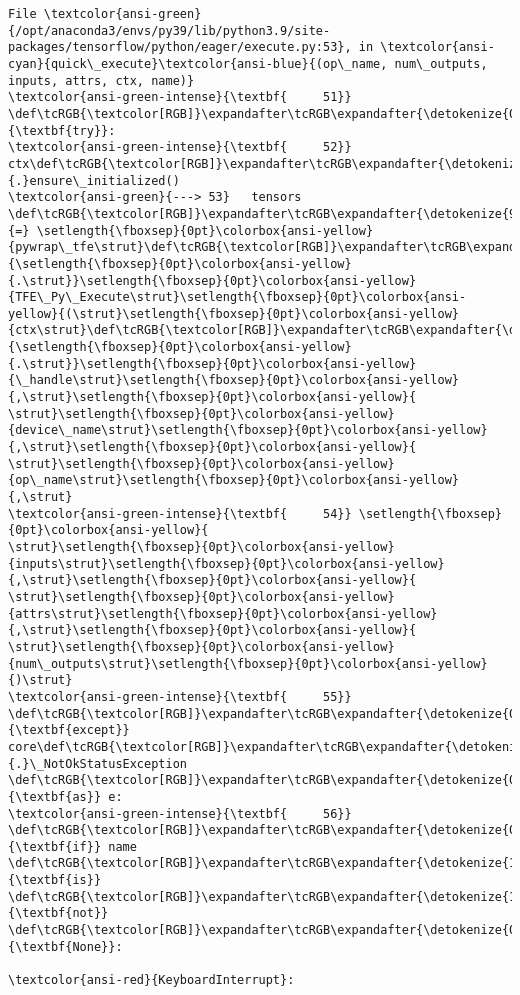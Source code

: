 \documentclass[11pt]{article}
\begin{document}
\begin{Verbatim}[commandchars=\\\{\}, frame=single, framerule=2mm, rulecolor=\color{outerrorbackground}]
File \textcolor{ansi-green}{/opt/anaconda3/envs/py39/lib/python3.9/site-packages/tensorflow/python/eager/execute.py:53}, in \textcolor{ansi-cyan}{quick\_execute}\textcolor{ansi-blue}{(op\_name, num\_outputs, inputs, attrs, ctx, name)}
\textcolor{ansi-green-intense}{\textbf{     51}} \def\tcRGB{\textcolor[RGB]}\expandafter\tcRGB\expandafter{\detokenize{0,135,0}}{\textbf{try}}:
\textcolor{ansi-green-intense}{\textbf{     52}}   ctx\def\tcRGB{\textcolor[RGB]}\expandafter\tcRGB\expandafter{\detokenize{98,98,98}}{.}ensure\_initialized()
\textcolor{ansi-green}{---> 53}   tensors \def\tcRGB{\textcolor[RGB]}\expandafter\tcRGB\expandafter{\detokenize{98,98,98}}{=} \setlength{\fboxsep}{0pt}\colorbox{ansi-yellow}{pywrap\_tfe\strut}\def\tcRGB{\textcolor[RGB]}\expandafter\tcRGB\expandafter{\detokenize{98,98,98}}{\setlength{\fboxsep}{0pt}\colorbox{ansi-yellow}{.\strut}}\setlength{\fboxsep}{0pt}\colorbox{ansi-yellow}{TFE\_Py\_Execute\strut}\setlength{\fboxsep}{0pt}\colorbox{ansi-yellow}{(\strut}\setlength{\fboxsep}{0pt}\colorbox{ansi-yellow}{ctx\strut}\def\tcRGB{\textcolor[RGB]}\expandafter\tcRGB\expandafter{\detokenize{98,98,98}}{\setlength{\fboxsep}{0pt}\colorbox{ansi-yellow}{.\strut}}\setlength{\fboxsep}{0pt}\colorbox{ansi-yellow}{\_handle\strut}\setlength{\fboxsep}{0pt}\colorbox{ansi-yellow}{,\strut}\setlength{\fboxsep}{0pt}\colorbox{ansi-yellow}{ \strut}\setlength{\fboxsep}{0pt}\colorbox{ansi-yellow}{device\_name\strut}\setlength{\fboxsep}{0pt}\colorbox{ansi-yellow}{,\strut}\setlength{\fboxsep}{0pt}\colorbox{ansi-yellow}{ \strut}\setlength{\fboxsep}{0pt}\colorbox{ansi-yellow}{op\_name\strut}\setlength{\fboxsep}{0pt}\colorbox{ansi-yellow}{,\strut}
\textcolor{ansi-green-intense}{\textbf{     54}} \setlength{\fboxsep}{0pt}\colorbox{ansi-yellow}{                                      \strut}\setlength{\fboxsep}{0pt}\colorbox{ansi-yellow}{inputs\strut}\setlength{\fboxsep}{0pt}\colorbox{ansi-yellow}{,\strut}\setlength{\fboxsep}{0pt}\colorbox{ansi-yellow}{ \strut}\setlength{\fboxsep}{0pt}\colorbox{ansi-yellow}{attrs\strut}\setlength{\fboxsep}{0pt}\colorbox{ansi-yellow}{,\strut}\setlength{\fboxsep}{0pt}\colorbox{ansi-yellow}{ \strut}\setlength{\fboxsep}{0pt}\colorbox{ansi-yellow}{num\_outputs\strut}\setlength{\fboxsep}{0pt}\colorbox{ansi-yellow}{)\strut}
\textcolor{ansi-green-intense}{\textbf{     55}} \def\tcRGB{\textcolor[RGB]}\expandafter\tcRGB\expandafter{\detokenize{0,135,0}}{\textbf{except}} core\def\tcRGB{\textcolor[RGB]}\expandafter\tcRGB\expandafter{\detokenize{98,98,98}}{.}\_NotOkStatusException \def\tcRGB{\textcolor[RGB]}\expandafter\tcRGB\expandafter{\detokenize{0,135,0}}{\textbf{as}} e:
\textcolor{ansi-green-intense}{\textbf{     56}}   \def\tcRGB{\textcolor[RGB]}\expandafter\tcRGB\expandafter{\detokenize{0,135,0}}{\textbf{if}} name \def\tcRGB{\textcolor[RGB]}\expandafter\tcRGB\expandafter{\detokenize{175,0,255}}{\textbf{is}} \def\tcRGB{\textcolor[RGB]}\expandafter\tcRGB\expandafter{\detokenize{175,0,255}}{\textbf{not}} \def\tcRGB{\textcolor[RGB]}\expandafter\tcRGB\expandafter{\detokenize{0,135,0}}{\textbf{None}}:

\textcolor{ansi-red}{KeyboardInterrupt}: 
    \end{Verbatim}
\end{document}
